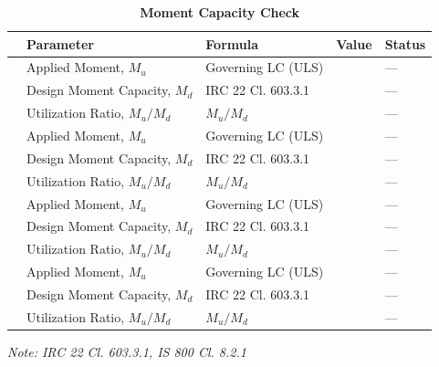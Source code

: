 \documentclass[12pt,a4paper]{report}
\numberwithin{table}{chapter}
\numberwithin{figure}{chapter}
\begin{document}
\vspace{1em}
\begin{longtable}{|C{2.5cm}|C{3.5cm}|C{3.5cm}|>{\centering\arraybackslash}p{4.2cm}|C{1.8cm}|}
\caption{\textbf{Moment Capacity Check}} \\
\hline
\textbf{} & \textbf{Parameter} & \textbf{Formula} & \textbf{Value} & \textbf{Status} \\[6pt]
\hline
{} & Applied Moment, $M_u$ & Governing LC (ULS) &  & --- \\[6pt]
 & Design Moment Capacity, $M_d$ & IRC 22 Cl. 603.3.1 &  & --- \\[6pt]
 & Utilization Ratio, $M_u / M_d$ & $M_u / M_d$ &  & --- \\[6pt]
\hline
{} & Applied Moment, $M_u$ & Governing LC (ULS) &  & --- \\[6pt]
 & Design Moment Capacity, $M_d$ & IRC 22 Cl. 603.3.1 &  & --- \\[6pt]
 & Utilization Ratio, $M_u / M_d$ & $M_u / M_d$ &  & --- \\[6pt]
\hline
{} & Applied Moment, $M_u$ & Governing LC (ULS) &  & --- \\[6pt]
 & Design Moment Capacity, $M_d$ & IRC 22 Cl. 603.3.1 &  & --- \\[6pt]
 & Utilization Ratio, $M_u / M_d$ & $M_u / M_d$ &  & --- \\[6pt]
\hline
{} & Applied Moment, $M_u$ & Governing LC (ULS) &  & --- \\[6pt]
 & Design Moment Capacity, $M_d$ & IRC 22 Cl. 603.3.1 &  & --- \\[6pt]
 & Utilization Ratio, $M_u / M_d$ & $M_u / M_d$ &  & --- \\[6pt]
\hline
\end{longtable}
\noindent\textit{Note: IRC 22 Cl. 603.3.1, IS 800 Cl. 8.2.1}
\end{document}
